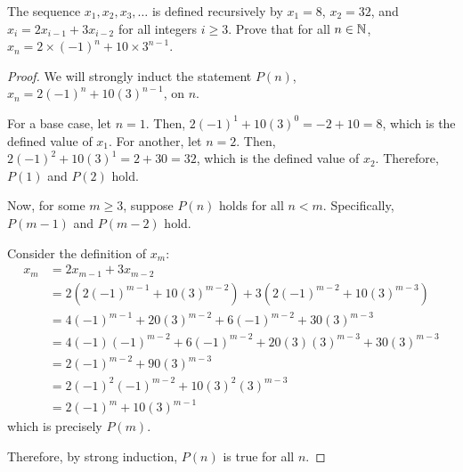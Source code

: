 \question The sequence $x_1, x_2, x_3, \dots$ is defined recursively by
$x_1=8$, $x_2=32$, and $x_i = 2x_{i-1} + 3x_{i-2}$ for all integers $i \geq 3$.
Prove that for all $n\in\mathbb{N}$, $x_n = 2 \times (-1)^n + 10 \times 3^{n-1}$.
\begin{proof}
  We will strongly induct the statement $P(n)$, $x_n = 2(-1)^n + 10(3)^{n-1}$, on $n$.

  For a base case, let $n = 1$.
  Then, $2(-1)^1 + 10(3)^0 = -2+10 = 8$, which is the defined value of $x_1$.
  For another, let $n = 2$.
  Then, $2(-1)^2 + 10(3)^1 = 2+30 = 32$, which is the defined value of $x_2$.
  Therefore, $P(1)$ and $P(2)$ hold.

  Now, for some $m \geq 3$, suppose $P(n)$ holds for all $n < m$.
  Specifically, $P(m-1)$ and $P(m-2)$ hold.

  Consider the definition of $x_m$:
  \begin{align*}
    x_m & = 2x_{m-1} + 3x_{m-2}                                                                   \\
        & = 2\left( 2(-1)^{m-1} + 10(3)^{m-2} \right) + 3\left( 2(-1)^{m-2} + 10(3)^{m-3} \right) \\
        & = 4(-1)^{m-1} + 20(3)^{m-2} + 6(-1)^{m-2} + 30(3)^{m-3}                                 \\
        & = 4(-1)(-1)^{m-2} + 6(-1)^{m-2} + 20(3)(3)^{m-3}  + 30(3)^{m-3}                         \\
        & = 2(-1)^{m-2} + 90(3)^{m-3}                                                             \\
        & = 2(-1)^2(-1)^{m-2} + 10(3)^2(3)^{m-3}                                                  \\
        & = 2(-1)^m + 10(3)^{m-1}
  \end{align*}
  which is precisely $P(m)$.

  Therefore, by strong induction, $P(n)$ is true for all $n$.
\end{proof}


